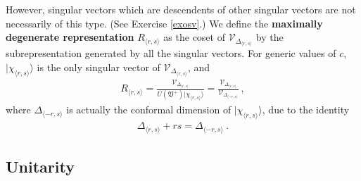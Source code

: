 \documentclass[12pt, a4paper, notitlepage, twoside]{report}
\numberwithin{equation}{section}
\theoremstyle{break}
\begin{document}
However, singular vectors which are descendents of other singular vectors are not necessarily of this type. (See 
Exercise \ref{exosv}.) We define the \textbf{\boldmath maximally degenerate representation} $R_{\langle r,s \rangle}$ as the coset of $\mathcal{V}_{\Delta_{\langle r,s \rangle}}$ by the subrepresentation generated by all the singular vectors. 
For generic values of $c$, $|\chi_{\langle r,s \rangle}\rangle$ is the only singular vector of $\mathcal{V}_{\Delta_{\langle r,s \rangle}}$, and 
\begin{align}
 R_{\langle r,s\rangle} =\frac{\mathcal{V}_{\Delta_{\langle r,s \rangle}}}{U(\mathfrak{V}^+) |\chi_{\langle r,s \rangle}\rangle }
= \frac{\mathcal{V}_{\Delta_{\langle r,s \rangle}}}{\mathcal{V}_{\Delta_{\langle -r,s \rangle}} }\ ,
\end{align}
where $\Delta_{\langle -r,s \rangle}$ is actually the conformal dimension of $|\chi_{\langle r,s \rangle}\rangle$, due to the identity
\begin{align}
 \Delta_{\langle r,s \rangle} + rs = \Delta_{\langle -r,s \rangle}\ .
\label{dmr}
\end{align}



\subsection{Unitarity \label{secuni}}
\end{document}
